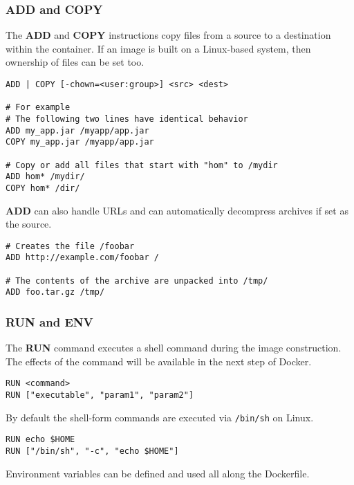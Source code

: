 \documentclass{article}
\begin{document}
\subsubsection{ADD and COPY}
The \textbf{ADD} and \textbf{COPY} instructions copy files from a source to a destination within the container. If an image is built on a Linux-based system, then ownership of files can be set too. \\

\begin{lstlisting}[language=docker,breaklines=true,label={code:compose}]
ADD | COPY [-chown=<user:group>] <src> <dest>

# For example
# The following two lines have identical behavior
ADD my_app.jar /myapp/app.jar
COPY my_app.jar /myapp/app.jar

# Copy or add all files that start with "hom" to /mydir
ADD hom* /mydir/
COPY hom* /dir/
\end{lstlisting}
\vspace{.4cm}
\textbf{ADD} can also handle URLs and can automatically decompress archives if set as the source. \\

\begin{lstlisting}[language=docker,breaklines=true,label={code:compose}]
# Creates the file /foobar
ADD http://example.com/foobar /

# The contents of the archive are unpacked into /tmp/
ADD foo.tar.gz /tmp/
\end{lstlisting}

\subsubsection{RUN and ENV}
The \textbf{RUN} command executes a shell command during the image construction. The effects of the command will be available in the next step of Docker. \\

\begin{lstlisting}[language=docker,breaklines=true,label={code:compose}]
RUN <command>
RUN ["executable", "param1", "param2"]
\end{lstlisting}
\vspace{.4cm}
By default the shell-form commands are executed via \verb|/bin/sh| on Linux. \\

\begin{lstlisting}[language=docker,breaklines=true,label={code:compose}]
RUN echo $HOME
RUN ["/bin/sh", "-c", "echo $HOME"]
\end{lstlisting}
\vspace{.4cm}
Environment variables can be defined and used all along the Dockerfile. \\
\end{document}
